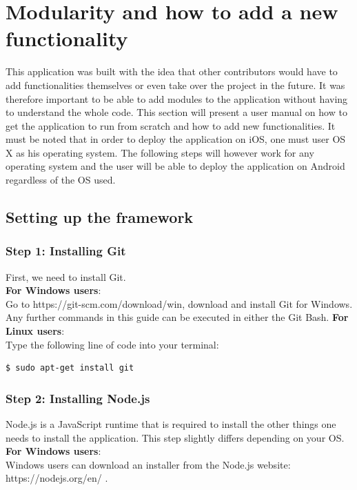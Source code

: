 \documentclass{eplmastersthesis}
\begin{document}
\section{Modularity and how to add a new functionality}
This application was built with the idea that other contributors would have to add functionalities themselves or even take over the project in the future. It was therefore important to be able to add modules to the application without having to understand the whole code. 
This section will present a user manual on how to get the application to run from scratch and how to add new functionalities.  It must be noted that in order to deploy the application on iOS, one must user OS X as his operating system.  The following steps will however work for any operating system and the user will be able to deploy the application on Android regardless of the OS used.
\subsection{Setting up the framework}
\subsubsection{Step 1: Installing Git}
First,  we need to install Git.\\
\textbf{For Windows users}: \\
Go to https://git-scm.com/download/win, download and install Git for Windows. Any further commands in this guide can be executed in either the Git Bash. 
\textbf{For Linux users}: \\
Type the following line of code into your terminal:
\begin{lstlisting}[language=bash]
  $ sudo apt-get install git
\end{lstlisting}


\subsubsection{Step 2: Installing Node.js}

Node.js is a JavaScript runtime that is required to install the other things one needs to install the application. This step slightly differs depending on your OS.\\

\textbf{For Windows users}: \\
Windows users can download an installer from the Node.js website: https://nodejs.org/en/ .\\
\end{document}
